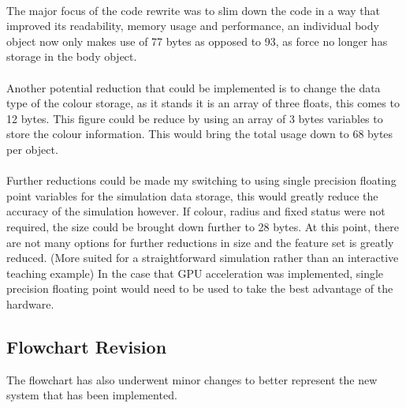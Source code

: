 {\paragraph{}
The major focus of the code rewrite was to slim down the code in a way that improved its readability, memory usage and performance, an individual body object now only makes use of 77 bytes as opposed to 93, as force no longer has storage in the body object.

\paragraph{}
Another potential reduction that could be implemented is to change the data type of the colour storage, as it stands it is an array of three floats, this comes to 12 bytes. This figure could be reduce by using an array of 3 bytes variables to store the colour information. This would bring the total usage down to 68 bytes per object.

\paragraph{}
Further reductions could be made my switching to using single precision floating point variables for the simulation data storage, this would greatly reduce the accuracy of the simulation however. If colour, radius and fixed status were not required, the size could be brought down further to 28 bytes. At this point, there are not many options for further reductions in size and the feature set is greatly reduced. (More suited for a straightforward simulation rather than an interactive teaching example) In the case that GPU acceleration was implemented, single precision floating point would need to be used to take the best advantage of the hardware.

\pagebreak
\subsection{Flowchart Revision}
The flowchart has also underwent minor changes to better represent the new system that has been implemented.

}

